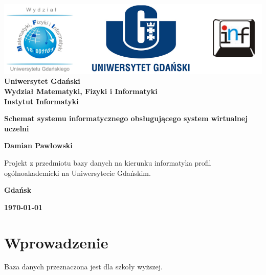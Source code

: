 \documentclass[12pt,a4paper]{article}
\newcommand{\hmwkTitle}{Schemat systemu informatycznego obsługującego system wirtualnej uczelni} %
\newcommand{\hmwkDueDate}{\today} %
\newcommand{\hmwkAuthorName}{Damian Pawłowski} %
\begin{document}
\begin{titlepage}
    \vfill
	\begin{center}
	\hspace*{-1cm}
	\vspace*{0.5cm}
    \includegraphics[scale=0.55]{imagens/loga.png}\\
	\textbf{Uniwersytet Gdański \\ [0.05cm]Wydział Matematyki, Fizyki i Informatyki \\ [0.05cm] Instytut Informatyki}

	\vspace{0.6cm}
	\vspace{4cm}
	{\huge \textbf{\hmwkTitle}}\vspace{8mm}
	
	{\large \textbf{\hmwkAuthorName}}\\[3cm]
	
		\hspace{.45\textwidth} %
	   \begin{minipage}{.5\textwidth}
	   Projekt z przedmiotu bazy danych na kierunku informatyka profil ogólnoakademicki na Uniwersytecie Gdańskim.\\[0.1cm]
	  \end{minipage}
	  \vfill
	
	\textbf{Gdańsk}
	
	\textbf{\hmwkDueDate}
	\end{center}
	
\end{titlepage}

\newpage

\setcounter{secnumdepth}{5}
\tableofcontents

\newpage

\section{Wprowadzenie}
\label{sec:introduction}

Baza danych przeznaczona jest dla szkoły wyższej.
\end{document}
